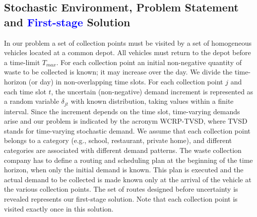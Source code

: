 \documentclass[authoryear,preprint,12pt]{elsarticle}
\newcommand{\rev}[1]{\textcolor{blue}{{#1}}}
\begin{document}
\subsection{Stochastic Environment, Problem Statement and \rev{First-stage} Solution}
In our problem a set of collection points must be visited by a set of homogeneous vehicles located at a common depot. 
All vehicles must return to the depot before a time-limit $T_{max}$. 
For each collection point an initial non-negative quantity of waste to be collected is known; it may increase over the day. We divide the time-horizon (or day) in non-overlapping time slots. For each collection point $j$ and each time slot $t$, the uncertain (non-negative) demand increment is represented as a random variable $\delta_{jt}$ with known distribution, taking values within a finite interval. Since the increment depends on the time slot, time-varying demands arise and our problem is indicated by the acronym WCRP-TVSD, where TVSD stands for time-varying stochastic demand. 
We assume that each collection point belongs to a category (e.g., school, restaurant, private home), and different categories are associated with different demand patterns. The waste collection company has to define a routing and scheduling plan at the beginning of the time horizon, when only the initial demand is known. This plan is executed and the actual demand to be collected is made known only at the arrival of the vehicle at the various collection points. The set of routes designed before uncertainty is revealed represents our first-stage solution. Note that each collection point is visited exactly once in this solution. 
\end{document}
